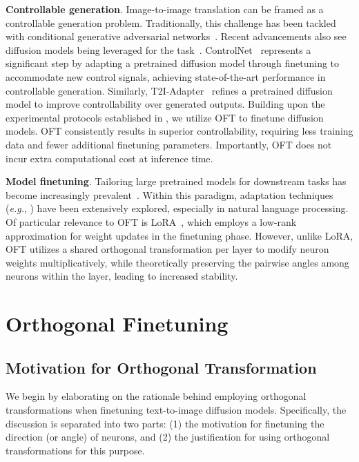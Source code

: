 \textbf{Controllable generation}. Image-to-image translation can be framed as a controllable generation problem. Traditionally, this challenge has been tackled with conditional generative adversarial networks~\cite{isola2017image,zhu2017toward,wang2018high,park2019semantic,choi2018stargan}. Recent advancements also see diffusion models being leveraged for the task~\cite{saharia2022palette,voynov2022sketch,wang2022pretraining}. ControlNet~\cite{zhang2023adding} represents a significant step by adapting a pretrained diffusion model through finetuning to accommodate new control signals, achieving state-of-the-art performance in controllable generation. Similarly, T2I-Adapter~\cite{mou2023t2i} refines a pretrained diffusion model to improve controllability over generated outputs. Building upon the experimental protocols established in \cite{zhang2023adding,mou2023t2i}, we utilize OFT to finetune diffusion models. OFT consistently results in superior controllability, requiring less training data and fewer additional finetuning parameters. Importantly, OFT does not incur extra computational cost at inference time.

\textbf{Model finetuning}. Tailoring large pretrained models for downstream tasks has become increasingly prevalent~\cite{devlin2018bert,brown2020language,he2022masked}. Within this paradigm, adaptation techniques (\emph{e.g.}, \cite{hulora2022,houlsby2019parameter,pfeiffer2020adapterfusion}) have been extensively explored, especially in natural language processing. Of particular relevance to OFT is LoRA~\cite{hulora2022}, which employs a low-rank approximation for weight updates in the finetuning phase. However, unlike LoRA, OFT utilizes a shared orthogonal transformation per layer to modify neuron weights multiplicatively, while theoretically preserving the pairwise angles among neurons within the layer, leading to increased stability.

\section{Orthogonal Finetuning}

\subsection{Motivation for Orthogonal Transformation}

We begin by elaborating on the rationale behind employing orthogonal transformations when finetuning text-to-image diffusion models. Specifically, the discussion is separated into two parts: (1) the motivation for finetuning the direction (or angle) of neurons, and (2) the justification for using orthogonal transformations for this purpose.

